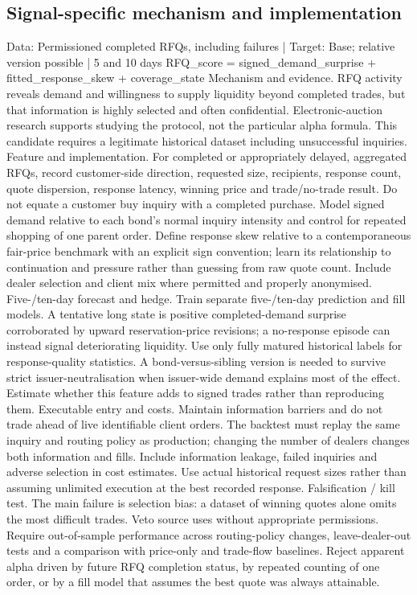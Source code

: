 \documentclass[10pt]{article}
\begin{document}
\subsection{Signal-specific mechanism and implementation}
Data: Permissioned completed RFQs, including failures  |  Target: Base; relative version possible  |  5 and 10 days RFQ\_score = signed\_demand\_surprise + fitted\_response\_skew + coverage\_state Mechanism and evidence.  RFQ activity reveals demand and willingness to supply liquidity beyond completed trades, but that information is highly selected and often confidential. Electronic-auction research supports studying the protocol, not the particular alpha formula. This candidate requires a legitimate historical dataset including unsuccessful inquiries. Feature and implementation.  For completed or appropriately delayed, aggregated RFQs, record customer-side direction, requested size, recipients, response count, quote dispersion, response latency, winning price and trade/no-trade result. Do not equate a customer buy inquiry with a completed purchase. Model signed demand relative to each bond’s normal inquiry intensity and control for repeated shopping of one parent order. Define response skew relative to a contemporaneous fair-price benchmark with an explicit sign convention; learn its relationship to continuation and pressure rather than guessing from raw quote count. Include dealer selection and client mix where permitted and properly anonymised. Five-/ten-day forecast and hedge.  Train separate five-/ten-day prediction and fill models. A tentative long state is positive completed-demand surprise corroborated by upward reservation-price revisions; a no-response episode can instead signal deteriorating liquidity. Use only fully matured historical labels for response-quality statistics. A bond-versus-sibling version is needed to survive strict issuer-neutralisation when issuer-wide demand explains most of the effect. Estimate whether this feature adds to signed trades rather than reproducing them. Executable entry and costs.  Maintain information barriers and do not trade ahead of live identifiable client orders. The backtest must replay the same inquiry and routing policy as production; changing the number of dealers changes both information and fills. Include information leakage, failed inquiries and adverse selection in cost estimates. Use actual historical request sizes rather than assuming unlimited execution at the best recorded response. Falsification / kill test.  The main failure is selection bias: a dataset of winning quotes alone omits the most difficult trades. Veto source uses without appropriate permissions. Require out-of-sample performance across routing-policy changes, leave-dealer-out tests and a comparison with price-only and trade-flow baselines. Reject apparent alpha driven by future RFQ completion status, by repeated counting of one order, or by a fill model that assumes the best quote was always attainable.
\end{document}
